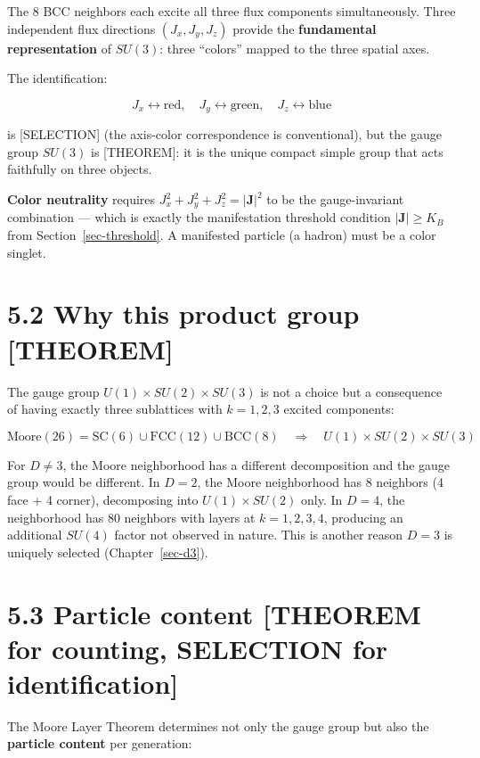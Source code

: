 \documentclass[
  11pt,
  letterpaper,
  twoside,
  openright]{book}
\begin{document}
The 8 BCC neighbors each excite all three flux components
simultaneously. Three independent flux directions \((J_x, J_y, J_z)\)
provide the \textbf{fundamental representation} of \(SU(3)\): three
``colors'' mapped to the three spatial axes.

The identification:

\[
J_x \leftrightarrow \text{red}, \quad J_y \leftrightarrow \text{green}, \quad J_z \leftrightarrow \text{blue}
\]

is {[}SELECTION{]} (the axis-color correspondence is conventional), but
the gauge group \(SU(3)\) is {[}THEOREM{]}: it is the unique compact
simple group that acts faithfully on three objects.

\textbf{Color neutrality} requires
\(J_x^2 + J_y^2 + J_z^2 = |\mathbf{J}|^2\) to be the gauge-invariant
combination --- which is exactly the manifestation threshold condition
\(|\mathbf{J}| \geq K_B\) from Section~\ref{sec-threshold}. A manifested
particle (a hadron) must be a color singlet.

\section{5.2 Why this product group
{[}THEOREM{]}}\label{why-this-product-group-theorem}

The gauge group \(U(1) \times SU(2) \times SU(3)\) is not a choice but a
consequence of having exactly three sublattices with \(k = 1, 2, 3\)
excited components:

\[
\text{Moore}(26) = \text{SC}(6) \cup \text{FCC}(12) \cup \text{BCC}(8) \quad \Longrightarrow \quad U(1) \times SU(2) \times SU(3)
\]

For \(D \neq 3\), the Moore neighborhood has a different decomposition
and the gauge group would be different. In \(D = 2\), the Moore
neighborhood has 8 neighbors (4 face + 4 corner), decomposing into
\(U(1) \times SU(2)\) only. In \(D = 4\), the neighborhood has 80
neighbors with layers at \(k = 1, 2, 3, 4\), producing an additional
\(SU(4)\) factor not observed in nature. This is another reason
\(D = 3\) is uniquely selected (Chapter~\ref{sec-d3}).

\section{5.3 Particle content {[}THEOREM for counting, SELECTION for
identification{]}}\label{particle-content-theorem-for-counting-selection-for-identification}

The Moore Layer Theorem determines not only the gauge group but also the
\textbf{particle content} per generation:
\end{document}
